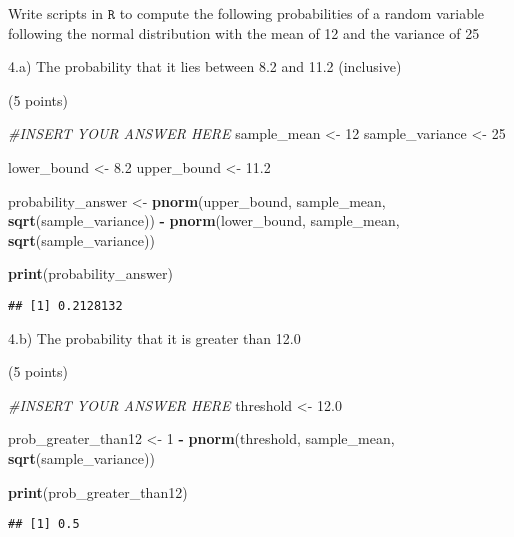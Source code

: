 \documentclass[
]{article}
\newenvironment{Shaded}{\begin{snugshade}}{\end{snugshade}}
\newcommand{\CommentTok}[1]{\textcolor[rgb]{0.56,0.35,0.01}{\textit{#1}}}
\newcommand{\DecValTok}[1]{\textcolor[rgb]{0.00,0.00,0.81}{#1}}
\newcommand{\FloatTok}[1]{\textcolor[rgb]{0.00,0.00,0.81}{#1}}
\newcommand{\FunctionTok}[1]{\textcolor[rgb]{0.13,0.29,0.53}{\textbf{#1}}}
\newcommand{\NormalTok}[1]{#1}
\newcommand{\OtherTok}[1]{\textcolor[rgb]{0.56,0.35,0.01}{#1}}
\newcommand{\SpecialCharTok}[1]{\textcolor[rgb]{0.81,0.36,0.00}{\textbf{#1}}}
\begin{document}
Write scripts in \(\texttt{R}\) to compute the following probabilities
of a random variable following the normal distribution with the mean of
12 and the variance of 25

4.a) The probability that it lies between 8.2 and 11.2 (inclusive)

(5 points)

\begin{Shaded}
\begin{Highlighting}[]
\CommentTok{\#INSERT YOUR ANSWER HERE}
\NormalTok{sample\_mean }\OtherTok{\textless{}{-}} \DecValTok{12}
\NormalTok{sample\_variance }\OtherTok{\textless{}{-}} \DecValTok{25}

\NormalTok{lower\_bound }\OtherTok{\textless{}{-}} \FloatTok{8.2}
\NormalTok{upper\_bound }\OtherTok{\textless{}{-}} \FloatTok{11.2}

\NormalTok{probability\_answer }\OtherTok{\textless{}{-}} \FunctionTok{pnorm}\NormalTok{(upper\_bound, sample\_mean, }\FunctionTok{sqrt}\NormalTok{(sample\_variance)) }\SpecialCharTok{{-}} \FunctionTok{pnorm}\NormalTok{(lower\_bound, sample\_mean, }\FunctionTok{sqrt}\NormalTok{(sample\_variance))}

\FunctionTok{print}\NormalTok{(probability\_answer)}
\end{Highlighting}
\end{Shaded}

\begin{verbatim}
## [1] 0.2128132
\end{verbatim}

4.b) The probability that it is greater than 12.0

(5 points)

\begin{Shaded}
\begin{Highlighting}[]
\CommentTok{\#INSERT YOUR ANSWER HERE}
\NormalTok{threshold }\OtherTok{\textless{}{-}} \FloatTok{12.0}

\NormalTok{prob\_greater\_than12 }\OtherTok{\textless{}{-}} \DecValTok{1} \SpecialCharTok{{-}} \FunctionTok{pnorm}\NormalTok{(threshold,}
\NormalTok{                                        sample\_mean,}
                                    \FunctionTok{sqrt}\NormalTok{(sample\_variance))}

\FunctionTok{print}\NormalTok{(prob\_greater\_than12)}
\end{Highlighting}
\end{Shaded}

\begin{verbatim}
## [1] 0.5
\end{verbatim}
\end{document}
